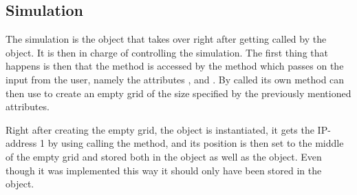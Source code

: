 \subsection{Simulation}
The simulation is the object that takes over right after getting called by the  object. It is then in charge of controlling the simulation. The first thing that happens is then that the  method is accessed by the  method which passes on the input from the user, namely the attributes , and . By called its own method  can then use  to create an empty grid of the size specified by the previously mentioned attributes.\bigbreak

\noindent Right after creating the empty grid, the  object is instantiated, it gets the IP-address 1 by using calling the  method, and its position is then set to the middle of the empty grid and stored both in the  object as well as the  object. Even though it was implemented this way it should only have been stored in the  object.





























